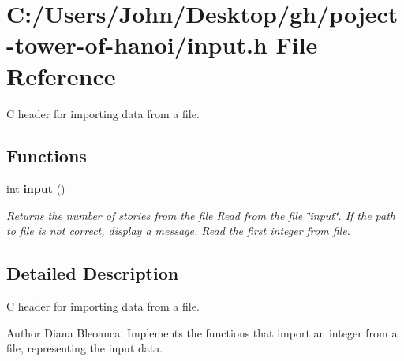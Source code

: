 \section{C\+:/\+Users/\+John/\+Desktop/gh/poject-\/tower-\/of-\/hanoi/input.h File Reference}
\label{input_8h}


C header for importing data from a file.  


\subsection*{Functions}
\begin{DoxyCompactItemize}
\item 
\mbox{\label{input_8h_ab0565bc395d5cc3c0d76e4fd26e3c87f}} 
int \textbf{ input} ()
\begin{DoxyCompactList}\small\item\em Returns the number of stories from the file Read from the file \char`\"{}input\char`\"{}. If the path to file is not correct, display a message. Read the first integer from file. \end{DoxyCompactList}\end{DoxyCompactItemize}


\subsection{Detailed Description}
C header for importing data from a file. 

\begin{DoxyAuthor}{Author}
Diana Bleoanca. Implements the functions that import an integer from a file, representing the input data. 
\end{DoxyAuthor}
